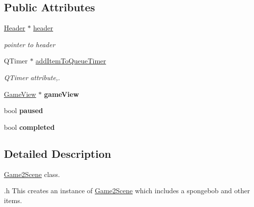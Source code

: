 \subsection*{Public Attributes}
\begin{DoxyCompactItemize}
\item 
\hypertarget{classGame2Scene_ab20468619c00df91ed73eb1cce3ce5cf}{\hyperlink{classHeader}{Header} $\ast$ \hyperlink{classGame2Scene_ab20468619c00df91ed73eb1cce3ce5cf}{header}}\label{classGame2Scene_ab20468619c00df91ed73eb1cce3ce5cf}

\begin{DoxyCompactList}\small\item\em pointer to header \end{DoxyCompactList}\item 
\hypertarget{classGame2Scene_aae652a43bd3057bdeaec0a058aa47549}{Q\-Timer $\ast$ \hyperlink{classGame2Scene_aae652a43bd3057bdeaec0a058aa47549}{add\-Item\-To\-Queue\-Timer}}\label{classGame2Scene_aae652a43bd3057bdeaec0a058aa47549}

\begin{DoxyCompactList}\small\item\em Q\-Timer attribute,. \end{DoxyCompactList}\item 
\hypertarget{classGame2Scene_afded2510186d15031dc9099375d26769}{\hyperlink{classGameView}{Game\-View} $\ast$ {\bfseries game\-View}}\label{classGame2Scene_afded2510186d15031dc9099375d26769}

\item 
\hypertarget{classGame2Scene_a124c98a6c77d9fc892dda3b87bf9476f}{bool {\bfseries paused}}\label{classGame2Scene_a124c98a6c77d9fc892dda3b87bf9476f}

\item 
\hypertarget{classGame2Scene_a4ec4e660c6fe95e0fd328cf5648fd5ec}{bool {\bfseries completed}}\label{classGame2Scene_a4ec4e660c6fe95e0fd328cf5648fd5ec}

\end{DoxyCompactItemize}


\subsection{Detailed Description}
\hyperlink{classGame2Scene}{Game2\-Scene} class. 

.h This creates an instance of \hyperlink{classGame2Scene}{Game2\-Scene} which includes a spongebob and other items. 

